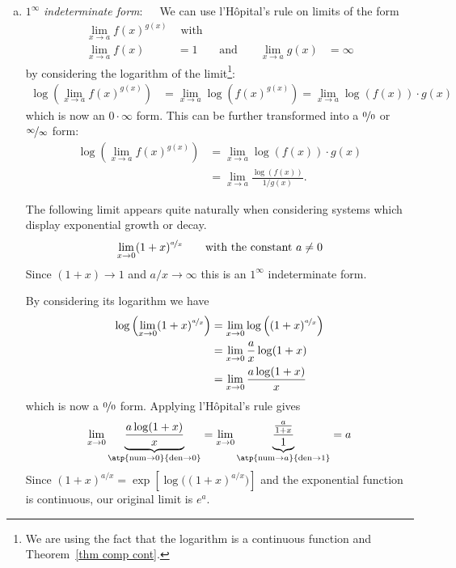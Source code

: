 \begin{enumerate}[(a)]
\item $1^\infty$ \emph{indeterminate form}:\ \ \ We can use l'H\^opital's rule on limits
of the form
\begin{align*}
\lim_{x\to a} f(x)^{g(x)} & \text{ with } \\
\lim_{x\to a} f(x) &= 1 & \text{ and } && \lim_{x \to a} g(x) &= \infty
\end{align*}
by considering the logarithm of the limit\footnote{We are using the fact that the
logarithm is a continuous function and Theorem~\ref{thm comp cont}.}:
\begin{align*}
\log\left( \lim_{x\to a} f(x)^{g(x)} \right)
&= \lim_{x\to a} \log\left( f(x)^{g(x)} \right)
= \lim_{x\to a} \log\left( f(x) \right) \cdot g(x)
\end{align*}
which is now an $0 \cdot \infty$ form. This can be further transformed into a
$\nicefrac00$ or $\nicefrac\infty\infty$ form:
\begin{align*}
\log\left( \lim_{x\to a} f(x)^{g(x)} \right)
&=\lim_{x\to a} \log\left( f(x) \right) \cdot g(x)\\
&= \lim_{x\to a} \frac{\log\left( f(x) \right)}{1/g(x)}.
\end{align*}

\begin{eg}\label{eg:hopitalL}
The following limit appears quite naturally when considering systems which display
exponential growth or decay.
\begin{align*}
\lim_{x\rightarrow 0}(1+x)^{\nicefrac{a}{x}}
\qquad\text{with the constant $a\ne 0$}
\end{align*}
Since $(1+x) \to 1$ and $a/x \to \infty$ this is an $1^\infty$ indeterminate form.

By considering its logarithm we have
\begin{align*}
  \log\left( \lim_{x\to 0}(1+x)^{\nicefrac{a}{x}}\right)
  &= \lim_{x\to 0}\log\left(  (1+x)^{\nicefrac{a}{x}}\right)\\
  &= \lim_{x\to 0} \frac{a}{x} \log(1+x) \\
  &= \lim_{x\to 0} \frac{a\log (1+x)}{x}
\end{align*}
which is now a $\nicefrac00$ form. Applying l'H\^opital's rule gives
\begin{align*}
\lim_{x\rightarrow 0}\underbrace{\frac{a\log(1+x)}{x}}_{\atp
        {\mathrm{num}\rightarrow 0}
        {\mathrm{den}\rightarrow 0}}
=\lim_{x\rightarrow 0}\underbrace{\frac{\frac{a}{1+x}}{1}}_{\atp
        {\mathrm{num}\rightarrow a}
        {\mathrm{den}\rightarrow 1}}
=a
\end{align*}
Since $(1 + x)^{a/x} = \exp\left[\log\Big((1 + x)^{a/x}\Big)\right]$ and the
exponential function is continuous, our original limit is $e^a$.


\end{eg}
\end{enumerate}
